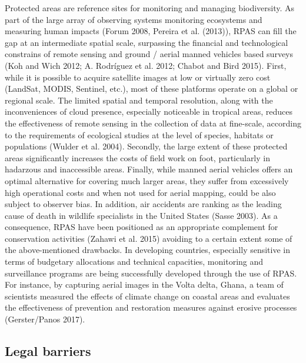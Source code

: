\documentclass[]{interact}
\theoremstyle{plain}%
\theoremstyle{definition}
\theoremstyle{remark}
\begin{document}
Protected areas are reference sites for monitoring and managing
biodiversity. As part of the large array of observing systems monitoring
ecosystems and measuring human impacts (Forum 2008, Pereira et al.
(2013)), RPAS can fill the gap at an intermediate spatial scale,
surpassing the financial and technological constrains of remote sensing
and ground / aerial manned vehicles based surveys (Koh and Wich 2012; A.
Rodríguez et al. 2012; Chabot and Bird 2015). First, while it is
possible to acquire satellite images at low or virtually zero cost
(LandSat, MODIS, Sentinel, etc.), most of these platforms operate on a
global or regional scale. The limited spatial and temporal resolution,
along with the inconveniences of cloud presence, especially noticeable
in tropical areas, reduces the effectiveness of remote sensing in the
collection of data at fine-scale, according to the requirements of
ecological studies at the level of species, habitats or populations
(Wulder et al. 2004). Secondly, the large extent of these protected
areas significantly increases the costs of field work on foot,
particularly in hadarzous and inaccessible areas. Finally, while manned
aerial vehicles offers an optimal alternative for covering much larger
areas, they suffer from excessively high operational costs and when not
used for aerial mapping, could be also subject to observer bias. In
addition, air accidents are ranking as the leading cause of death in
wildlife specialists in the United States (Sasse 2003). As a
consequence, RPAS have been positioned as an appropriate complement for
conservation activities (Zahawi et al. 2015) avoiding to a certain
extent some of the above-mentioned drawbacks. In developing countries,
especially sensitive in terms of budgetary allocations and technical
capacities, monitoring and surveillance programs are being successfully
developed through the use of RPAS. For instance, by capturing aerial
images in the Volta delta, Ghana, a team of scientists measured the
effects of climate change on coastal areas and evaluates the
effectiveness of prevention and restoration measures against erosive
processes (Gerster/Panos 2017).

\subsection{Legal barriers}\label{legal-barriers}
\end{document}

